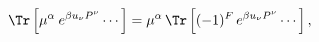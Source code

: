 \begin{equation}
   \Tr \left[ \mu^\alpha \> e^{\beta u_\nu P^\nu} \cdots \right]
   =
   \mu^\alpha \, \Tr \left[ (-1)^F \, e^{\beta u_\nu P^\nu} \cdots \right] ,
\end{equation}

